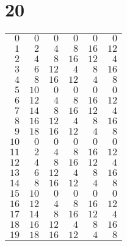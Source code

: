 \documentclass[a4paper]{scrartcl}
\begin{document}
\section*{20}
\begin{tabular}{rrrrrr}
\toprule
$0$ & $0$ & $0$ & $0$ & $0$ & $0$ \\
$1$ & $2$ & $4$ & $8$ & $16$ & $12$ \\
$2$ & $4$ & $8$ & $16$ & $12$ & $4$ \\
$3$ & $6$ & $12$ & $4$ & $8$ & $16$ \\
$4$ & $8$ & $16$ & $12$ & $4$ & $8$ \\
$5$ & $10$ & $0$ & $0$ & $0$ & $0$ \\
$6$ & $12$ & $4$ & $8$ & $16$ & $12$ \\
$7$ & $14$ & $8$ & $16$ & $12$ & $4$ \\
$8$ & $16$ & $12$ & $4$ & $8$ & $16$ \\
$9$ & $18$ & $16$ & $12$ & $4$ & $8$ \\
$10$ & $0$ & $0$ & $0$ & $0$ & $0$ \\
$11$ & $2$ & $4$ & $8$ & $16$ & $12$ \\
$12$ & $4$ & $8$ & $16$ & $12$ & $4$ \\
$13$ & $6$ & $12$ & $4$ & $8$ & $16$ \\
$14$ & $8$ & $16$ & $12$ & $4$ & $8$ \\
$15$ & $10$ & $0$ & $0$ & $0$ & $0$ \\
$16$ & $12$ & $4$ & $8$ & $16$ & $12$ \\
$17$ & $14$ & $8$ & $16$ & $12$ & $4$ \\
$18$ & $16$ & $12$ & $4$ & $8$ & $16$ \\
$19$ & $18$ & $16$ & $12$ & $4$ & $8$ \\
\bottomrule
\end{tabular}
\end{document}

